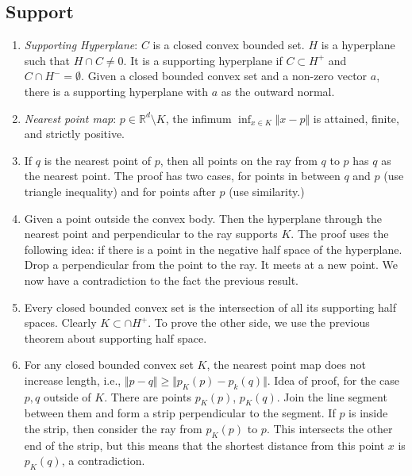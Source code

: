 \documentclass[a4paper,10pt,landscape]{article}
\def\R{\mathbb{R}}
\begin{document}
\begin{multicols}{3}
  \section{Support}
  \begin{enumerate}
  \item \emph{Supporting Hyperplane}: $C$ is a closed convex bounded set. $H$ is
    a hyperplane such that $H \cap C \neq 0$. It is a supporting hyperplane if
    $C \subset H^{+}$ and $C \cap H^{-} = \emptyset$. Given a closed bounded
    convex set and a non-zero vector $a$, there is a supporting hyperplane with
    $a$ as the outward normal.
  \item \emph{Nearest point map}: $p \in \R^d\setminus K$, the infimum
    $\inf_{x\in K} \Vert x - p\Vert$ is attained, finite, and strictly
    positive.
  \item If $q$ is the nearest point of $p$, then all points on the ray from $q$
    to $p$ has $q$ as the nearest point. The proof has two cases, for points in
    between $q$ and $p$ (use triangle inequality) and for points after $p$ (use
    similarity.)
  \item Given a point outside the convex body. Then the hyperplane through the
    nearest point and perpendicular to the ray supports $K$. The proof uses the
    following idea: if there is a point in the negative half space of the
    hyperplane. Drop a perpendicular from the point to the ray. It meets at a
    new point. We now have a contradiction to the fact the previous result.
  \item Every closed bounded convex set is the intersection of all its
    supporting half spaces. Clearly $K \subset \cap H^{+}$. To prove the other
    side, we use the previous theorem about supporting half space.
  \item For any closed bounded convex set $K$, the nearest point map does not
    increase length, i.e., $\Vert p - q\Vert \ge\Vert p_K(p) - p_k(q) \Vert$.
    Idea of proof, for the case $p, q$ outside of $K$. There are points
    $p_K(p)$, $p_K(q)$. Join the line segment between them and form a strip
    perpendicular to the segment. If $p$ is inside the strip, then consider the
    ray from $p_K(p)$ to $p$. This intersects the other end of the strip, but
    this means that the shortest distance from this point $x$ is $p_K(q)$, a
    contradiction.
  \end{enumerate}

\end{multicols}
\end{document}

